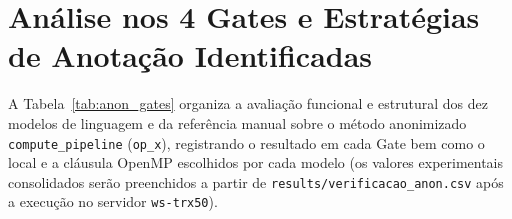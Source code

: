 \section{Análise nos 4 Gates e Estratégias de Anotação Identificadas}
\label{sec:anon_gates}

A Tabela~\ref{tab:anon_gates} organiza a avaliação funcional e estrutural dos dez modelos de linguagem e da referência manual sobre o método anonimizado \texttt{compute\_pipeline} (\texttt{op\_x}), registrando o resultado em cada Gate bem como o local e a cláusula OpenMP escolhidos por cada modelo (os valores experimentais consolidados serão preenchidos a partir de \texttt{results/verificacao\_anon.csv} após a execução no servidor \texttt{ws-trx50}).

